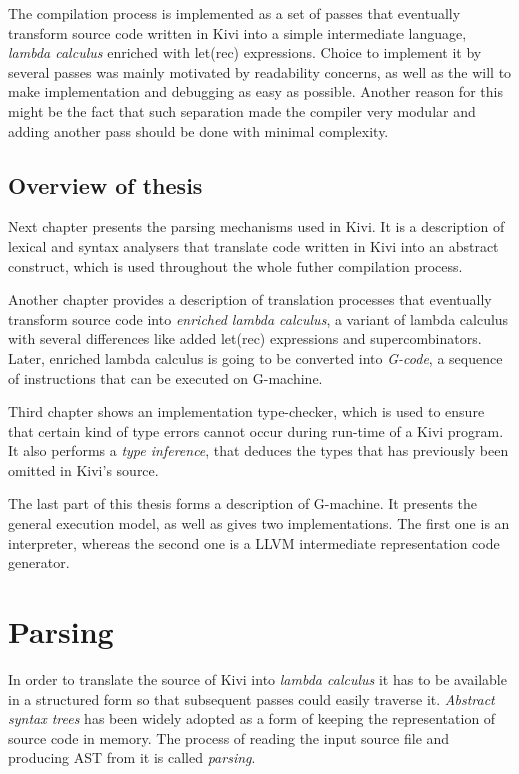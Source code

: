 \documentclass[12pt,a4paper]{report}
\begin{document}
The compilation process is implemented as a set of passes that eventually
transform source code written in Kivi into a simple intermediate language,
\textit{lambda calculus} enriched with let(rec) expressions. Choice to
implement it by several passes was mainly motivated by readability concerns, as
well as the will to make implementation and debugging as easy as possible.
Another reason for this might be the fact that such separation made the
compiler very modular and adding another pass should be done with minimal
complexity.

\section{Overview of thesis}
Next chapter presents the parsing mechanisms used in Kivi. It is a description
of lexical and syntax analysers that translate code written in Kivi into an
abstract construct, which is used throughout the whole futher compilation
process.

Another chapter provides a description of translation processes that eventually
transform source code into \textit{enriched lambda calculus}, a variant of
lambda calculus with several differences like added let(rec) expressions and
supercombinators. Later, enriched lambda calculus is going to be converted
into \textit{G-code}, a sequence of instructions that can be executed on
G-machine.

Third chapter shows an implementation type-checker, which is used to ensure
that certain kind of type errors cannot occur during run-time of a Kivi
program. It also performs a \textit{type inference}, that deduces the types
that has previously been omitted in Kivi's source.

The last part of this thesis forms a description of G-machine. It presents the
general execution model, as well as gives two implementations. The first one is
an interpreter, whereas the second one is a LLVM intermediate representation
code generator.

\chapter{Parsing}

In order to translate the source of Kivi into \textit{lambda calculus} it has
to be available in a structured form so that subsequent passes could easily
traverse it. \textit{Abstract syntax trees}\cite{ALSU07} has been widely
adopted as a form of keeping the representation of source code in memory. The
process of reading the input source file and producing AST from it is called
\textit{parsing}.
\end{document}
